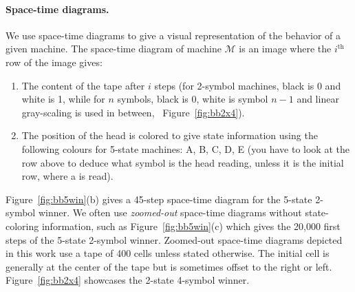 \paragraph*{Space-time diagrams.} We use space-time diagrams to give a visual representation of the behavior of a given machine. The space-time diagram of machine $\mathcal{M}$ is an image where the $i^\text{th}$ row of the image gives:
\begin{enumerate}
    \item The content of the tape after $i$ steps (for 2-symbol machines, black is 0 and white is 1, while for $n$ symbols, black is 0, white is symbol $n-1$ and linear gray-scaling is used in between, \eg~Figure~\ref{fig:bb2x4}).
    \item The position of the head is colored to give state information using the following colours for 5-state machines: \textcolor{colorA}{A},  \textcolor{colorB}{B},  \textcolor{colorC}{C},  \textcolor{colorD}{D},  \textcolor{colorE}{E} (you have to look at the row above to deduce what symbol is the head reading, unless it is the initial row, where a \szero is read).
\end{enumerate}

Figure~\ref{fig:bb5win}(b) gives a 45-step space-time diagram for the 5-state 2-symbol \BBfull winner. We often use \textit{zoomed-out} space-time diagrams without state-coloring information, such as Figure~\ref{fig:bb5win}(c) which gives the 20,000 first steps of the 5-state 2-symbol \BBfull winner. Zoomed-out space-time diagrams depicted in this work use a tape of 400 cells unless stated otherwise. The initial cell is generally at the center of the tape but is sometimes offset to the right or left. Figure~\ref{fig:bb2x4} showcases the 2-state 4-symbol \BBfull winner.


